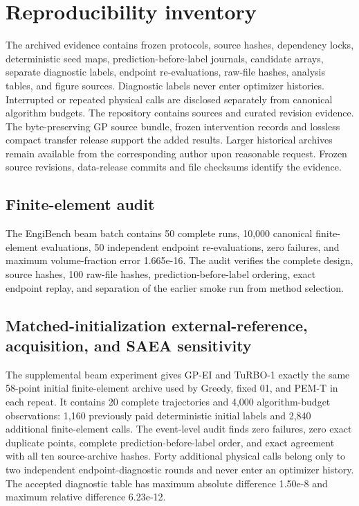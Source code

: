 \documentclass[suppldata]{interact}
\begin{document}
\hypertarget{reproducibility-inventory}{%
\section{Reproducibility inventory}\label{reproducibility-inventory}}

The archived evidence contains frozen protocols, source hashes, dependency locks, deterministic seed maps, prediction-before-label journals, candidate arrays, separate diagnostic labels, endpoint re-evaluations, raw-file hashes, analysis tables, and figure sources. Diagnostic labels never enter optimizer histories. Interrupted or repeated physical calls are disclosed separately from canonical algorithm budgets. The repository contains sources and curated revision evidence. The byte-preserving GP source bundle, frozen intervention records and lossless compact transfer release support the added results. Larger historical archives remain available from the corresponding author upon reasonable request. Frozen source revisions, data-release commits and file checksums identify the evidence.

\hypertarget{finite-element-audit}{%
\subsection{Finite-element audit}\label{finite-element-audit}}

The EngiBench beam batch contains 50 complete runs, 10,000 canonical finite-element evaluations, 50 independent endpoint re-evaluations, zero failures, and maximum volume-fraction error 1.665e-16. The audit verifies the complete design, source hashes, 100 raw-file hashes, prediction-before-label ordering, exact endpoint replay, and separation of the earlier smoke run from method selection.

\hypertarget{matched-initialization-external-reference-acquisition-and-saea-sensitivity}{%
\subsection{Matched-initialization external-reference, acquisition, and SAEA sensitivity}\label{matched-initialization-external-reference-acquisition-and-saea-sensitivity}}

The supplemental beam experiment gives GP-EI and TuRBO-1 exactly the same 58-point initial finite-element archive used by Greedy, fixed 01, and PEM-T in each repeat. It contains 20 complete trajectories and 4,000 algorithm-budget observations: 1,160 previously paid deterministic initial labels and 2,840 additional finite-element calls. The event-level audit finds zero failures, zero exact duplicate points, complete prediction-before-label order, and exact agreement with all ten source-archive hashes. Forty additional physical calls belong only to two independent endpoint-diagnostic rounds and never enter an optimizer history. The accepted diagnostic table has maximum absolute difference 1.50e-8 and maximum relative difference 6.23e-12.
\end{document}
